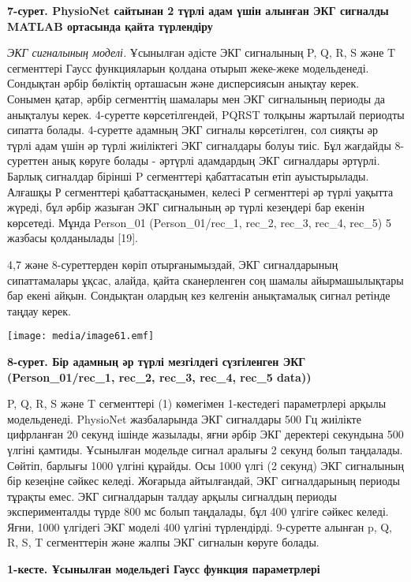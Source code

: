 \documentclass[
]{article}
\begin{document}
\textbf{7-сурет. PhysioNet сайтынан 2 түрлі адам үшін алынған ЭКГ
сигналды MATLAB ортасында қайта түрлендіру}

\emph{ЭКГ сигналының моделі.} Ұсынылған әдісте ЭКГ сигналының P, Q, R, S
және T сегменттері Гаусс функцияларын қолдана отырып жеке-жеке
модельденеді. Сондықтан әрбір бөліктің орташасын және дисперсиясын
анықтау керек. Сонымен қатар, әрбір сегменттің шамалары мен ЭКГ
сигналының периоды да анықталуы керек. 4-суретте көрсетілгендей, PQRST
толқыны жартылай периодты сипатта болады. 4-суретте адамның ЭКГ сигналы
көрсетілген, сол сияқты әр түрлі адам үшін әр түрлі жиіліктегі ЭКГ
сигналдары болуы тиіс. Бұл жағдайды 8-суреттен анық көруге болады -
әртүрлі адамдардың ЭКГ сигналдары әртүрлі. Барлық сигналдар бірінші P
сегменттері қабаттасатын етіп ауыстырылады. Алғашқы Р сегменттері
қабаттасқанымен, келесі Р сегменттері әр түрлі уақытта жүреді, бұл әрбір
жазыған ЭКГ сигналының әр түрлі кезеңдері бар екенін көрсетеді. Мұнда
Person\_01 (Person\_01/rec\_1, rec\_2, rec\_3, rec\_4, rec\_5) 5 жазбасы
қолданылады {[}19{]}.

4,7 және 8-суреттерден көріп отырғанымыздай, ЭКГ сигналдарының
сипаттамалары ұқсас, алайда, қайта сканерленген соң шамалы
айырмашылықтары бар екені айқын. Сондықтан олардың кез келгенін
анықтамалық сигнал ретінде таңдау керек.

\texttt{[image: media/image61.emf]}

\textbf{8-сурет. Бір адамның әр түрлі мезгілдегі сүзгіленген ЭКГ
(Person\_01/rec\_1, rec\_2, rec\_3, rec\_4, rec\_5 data))}

P, Q, R, S және T сегменттері (1) көмегімен 1-кестедегі параметрлері
арқылы модельденеді. PhysioNet жазбаларында ЭКГ сигналдары 500 Гц
жиілікте цифрланған 20 секунд ішінде жазылады, яғни әрбір ЭКГ деректері
секундына 500 үлгіні қамтиды. Ұсынылған модельде сигнал аралығы 2 секунд
болып таңдалады. Сөйтіп, барлығы 1000 үлгіні құрайды. Осы 1000 үлгі (2
секунд) ЭКГ сигналының бір кезеңіне сәйкес келеді. Жоғарыда айтылғандай,
ЭКГ сигналдарының периоды тұрақты емес. ЭКГ сигналдарын талдау арқылы
сигналдың периоды эксперименталды түрде 800 мс болып таңдалады, бұл 400
үлгіге сәйкес келеді. Яғни, 1000 үлгідегі ЭКГ моделі 400 үлгіні
түрлендірді. 9-суретте алынған p, Q, R, S, T сегменттерін және жалпы ЭКГ
сигналын көруге болады.

\textbf{1-кесте. Ұсынылған модельдегі Гаусс функция параметрлері}
\end{document}
